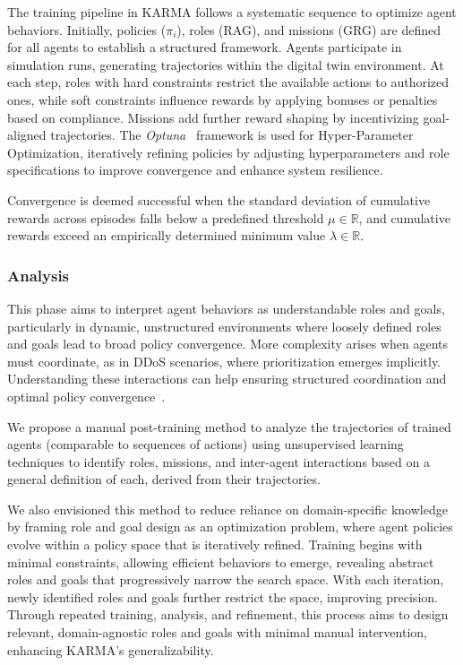 The training pipeline in KARMA follows a systematic sequence to optimize agent behaviors. Initially, policies (\(\pi_i\)), roles (RAG), and missions (GRG) are defined for all agents to establish a structured framework. Agents participate in simulation runs, generating trajectories within the digital twin environment. At each step, roles with hard constraints restrict the available actions to authorized ones, while soft constraints influence rewards by applying bonuses or penalties based on compliance. Missions add further reward shaping by incentivizing goal-aligned trajectories. The \textit{Optuna}~\cite{akiba2019optuna} framework is used for Hyper-Parameter Optimization, iteratively refining policies by adjusting hyperparameters and role specifications to improve convergence and enhance system resilience.

Convergence is deemed successful when the standard deviation of cumulative rewards across episodes falls below a predefined threshold $\mu \in \mathbb{R}$, and cumulative rewards exceed an empirically determined minimum value $\lambda \in \mathbb{R}$.


\subsubsection{Analysis}
\label{sec:analysis}

This phase aims to interpret agent behaviors as understandable roles and goals, particularly in dynamic, unstructured environments where loosely defined roles and goals lead to broad policy convergence. More complexity arises when agents must coordinate, as in DDoS scenarios, where prioritization emerges implicitly. Understanding these interactions can help ensuring structured coordination and optimal policy convergence~\cite{Shoham2009MAS}.

We propose a manual post-training method to analyze the trajectories of trained agents (comparable to sequences of actions) using unsupervised learning techniques to identify roles, missions, and inter-agent interactions based on a general definition of each, derived from their trajectories.

We also envisioned this method to reduce reliance on domain-specific knowledge by framing role and goal design as an optimization problem, where agent policies evolve within a policy space that is iteratively refined. Training begins with minimal constraints, allowing efficient behaviors to emerge, revealing abstract roles and goals that progressively narrow the search space. With each iteration, newly identified roles and goals further restrict the space, improving precision. Through repeated training, analysis, and refinement, this process aims to design relevant, domain-agnostic roles and goals with minimal manual intervention, enhancing KARMA's generalizability.

